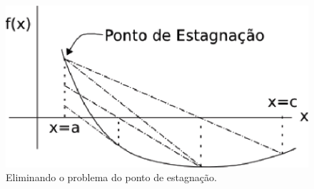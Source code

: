\begin{figure}[htb]
  \setlength{\abovecaptionskip}{20pt}
  \centering
  \includegraphics[scale=0.8]{capitulos/capitulo1/figuras/posicaofalsamodificado1.eps}
  \caption{Eliminando o problema do ponto de estagnação.}
  \label{fig:posicaofalsamodificado1}
\end{figure}


